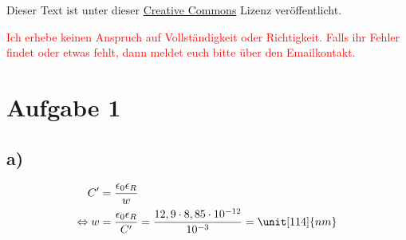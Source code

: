 




\maketitle

Dieser Text ist unter dieser \href{http://creativecommons.org/licenses/by-nc-sa/4.0/}{Creative Commons} Lizenz veröffentlicht.

\textcolor{red}{Ich erhebe keinen Anspruch auf Vollständigkeit oder Richtigkeit. Falls ihr Fehler findet oder etwas fehlt, dann meldet euch bitte über den Emailkontakt.}

\tableofcontents


\newpage



\section{Aufgabe 1}

\subsection*{a)}

\begin{align*}
C' &= \frac{\epsilon_0 \epsilon_R}{w} \\
\Leftrightarrow w &= \frac{\epsilon_0 \epsilon_R}{C'} = \frac{12,9 \cdot 8,85 \cdot 10^{-12}}{10^{-3}} = \unit[114]{nm}
\end{align*}



